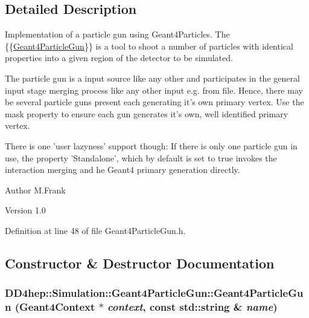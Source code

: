 \subsection{Detailed Description}
Implementation of a particle gun using Geant4Particles. The \{\{\hyperlink{class_d_d4hep_1_1_simulation_1_1_geant4_particle_gun}{Geant4ParticleGun}\}\} is a tool to shoot a number of particles with identical properties into a given region of the detector to be simulated.

The particle gun is a input source like any other and participates in the general input stage merging process like any other input e.g. from file. Hence, there may be several particle guns present each generating it's own primary vertex. Use the mask property to ensure each gun generates it's own, well identified primary vertex.

There is one 'user lazyness' support though: If there is only one particle gun in use, the property 'Standalone', which by default is set to true invokes the interaction merging and he Geant4 primary generation directly.

\begin{DoxyAuthor}{Author}
M.Frank 
\end{DoxyAuthor}
\begin{DoxyVersion}{Version}
1.0 
\end{DoxyVersion}


Definition at line 48 of file Geant4ParticleGun.h.

\subsection{Constructor \& Destructor Documentation}
\hypertarget{class_d_d4hep_1_1_simulation_1_1_geant4_particle_gun_a294f495235fd5fa6f6a949f0657f0e0e}{
\subsubsection[{Geant4ParticleGun}]{\setlength{\rightskip}{0pt plus 5cm}DD4hep::Simulation::Geant4ParticleGun::Geant4ParticleGun ({\bf Geant4Context} $\ast$ {\em context}, \/  const std::string \& {\em name})}}
\label{class_d_d4hep_1_1_simulation_1_1_geant4_particle_gun_a294f495235fd5fa6f6a949f0657f0e0e}


